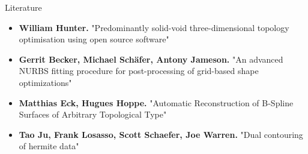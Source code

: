 \begin{frame}{Literature}
\begin{itemize}
\item \textbf{William Hunter.} "Predominantly solid-void three-dimensional topology optimisation using open source software"
\item \textbf{Gerrit Becker, Michael Sch\"afer, Antony Jameson.} "An advanced NURBS fitting procedure for post-processing of grid-based shape optimizations"
\item \textbf{Matthias Eck, Hugues Hoppe.} "Automatic Reconstruction of B-Spline Surfaces of Arbitrary Topological Type"
\item \textbf{Tao Ju, Frank Losasso, Scott Schaefer, Joe Warren.} "Dual contouring of hermite data"
\end{itemize}
\end{frame}
